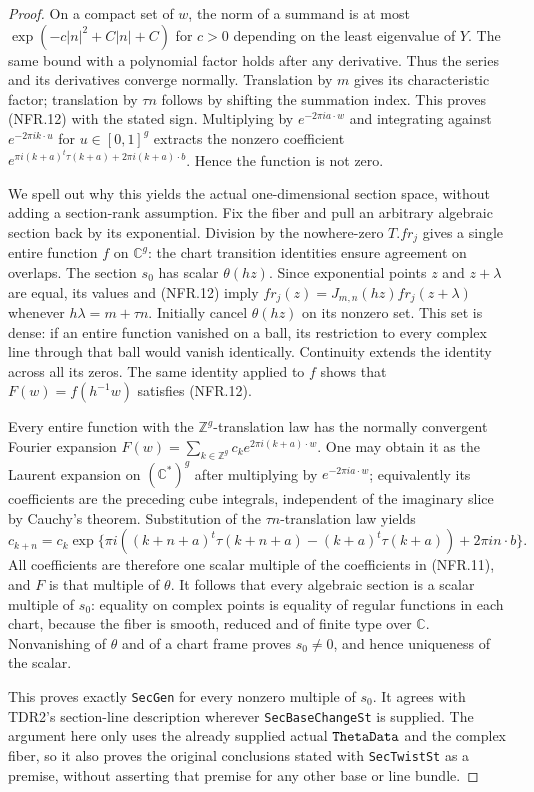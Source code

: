 \documentclass[11pt,a4paper]{article}
\numberwithin{equation}{section}
\theoremstyle{remark}\newtheorem{remark}[theorem]{Remark}
\begin{document}
\begin{proof}
On a compact set of $w$, the norm of a summand is at most
$\exp(-c|n|^2+C|n|+C)$ for $c>0$ depending on the least
eigenvalue of $Y$.  The same bound with a polynomial factor holds
after any derivative.  Thus the series and its derivatives converge
normally.  Translation by $m$ gives its characteristic factor;
translation by $\tau n$ follows by shifting the summation index.
This proves (NFR.12) with the stated sign.
Multiplying by $e^{-2\pi ia\cdot w}$ and integrating against
$e^{-2\pi ik\cdot u}$ for $u\in[0,1]^g$ extracts the nonzero
coefficient
$e^{\pi i(k+a)^t\tau(k+a)+2\pi i(k+a)\cdot b}$.
Hence the function is not zero.

We spell out why this yields the actual one-dimensional section
space, without adding a section-rank assumption.
Fix the fiber and pull an arbitrary algebraic section back by its
exponential.  Division by the nowhere-zero $T.fr_j$ gives a
single entire function $f$ on $\mathbb C^g$: the chart transition
identities ensure agreement on overlaps.  The section $s_0$
has scalar $\theta(hz)$.
Since exponential points $z$ and $z+\lambda$ are equal, its
values and (NFR.12) imply
$fr_j(z)=J_{m,n}(hz)fr_j(z+\lambda)$ whenever
$h\lambda=m+\tau n$.
Initially cancel $\theta(hz)$ on its nonzero set.  This set is
dense: if an entire function vanished on a ball, its restriction
to every complex line through that ball would vanish identically.
Continuity extends the identity across all its zeros.
The same identity applied to $f$ shows that $F(w)=f(h^{-1}w)$
satisfies (NFR.12).

Every entire function with the $\mathbb Z^g$-translation law
has the normally convergent Fourier expansion
$F(w)=\sum_{k\in\mathbb Z^g}c_k e^{2\pi i(k+a)\cdot w}$.
One may obtain it as the Laurent expansion on $(\mathbb C^*)^g$
after multiplying by $e^{-2\pi ia\cdot w}$; equivalently its
coefficients are the preceding cube integrals, independent of
the imaginary slice by Cauchy's theorem.
Substitution of the $\tau n$-translation law yields
\[
 c_{k+n}=c_k\exp\{\pi i((k+n+a)^t\tau(k+n+a)
                  -(k+a)^t\tau(k+a))+2\pi in\cdot b\}.
 \tag{NFR.13}
\]
All coefficients are therefore one scalar multiple of the
coefficients in (NFR.11), and $F$ is that multiple of $\theta$.
It follows that every algebraic section is a scalar multiple of
$s_0$: equality on complex points is equality of regular functions
in each chart, because the fiber is smooth, reduced and of finite
type over $\mathbb C$.  Nonvanishing of $\theta$ and of a chart
frame proves $s_0\ne0$, and hence uniqueness of the scalar.

This proves exactly \texttt{Sec\allowbreak Gen} for every nonzero multiple
of $s_0$.  It agrees with TDR2's section-line description wherever
\texttt{Sec\allowbreak Base\allowbreak Change\allowbreak St} is supplied.  The argument here only uses
the already supplied actual $\texttt{Theta\allowbreak Data}$ and the complex
fiber, so it also proves the original conclusions stated with
\texttt{Sec\allowbreak Twist\allowbreak St} as a premise, without asserting that premise
for any other base or line bundle.
\end{proof}
\end{document}
